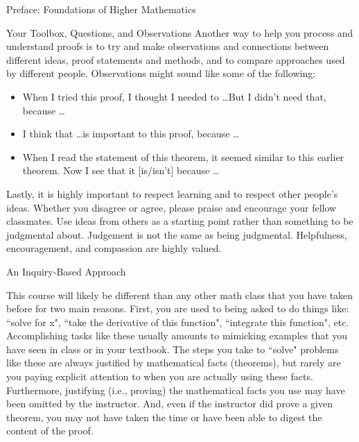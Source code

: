 \documentclass[11pt]{article}
\begin{document}
\begin{section}{Preface: Foundations of Higher Mathematics}
\begin{subsection}{Your Toolbox, Questions, and Observations}
Another way to help you process and understand proofs is to try and make observations and connections between different ideas, proof statements and methods, and to compare approaches used by different people. Observations might sound like some of the following:
\begin{itemize}
\item When I tried this proof, I thought I needed to \ldots But I didn't need that, because \ldots
\item I think that \ldots is important to this proof, because \ldots
\item When I read the statement of this theorem, it seemed similar to this earlier theorem. Now I see that it [is/isn't] because \ldots
\end{itemize}

Lastly, it is highly important to respect learning and to respect other people's ideas.  Whether you disagree or agree, please praise and encourage your fellow classmates.  Use ideas from others as a starting point rather than something to be judgmental about.  Judgement is not the same as being judgmental.  Helpfulness, encouragement, and compassion are highly valued.

\end{subsection}

\begin{subsection}{An Inquiry-Based Approach}

This course will likely be different than any other math class that you have taken before for two main reasons. First, you are used to being asked to do things like: ``solve for x", ``take the derivative of this function", ``integrate this function", etc. Accomplishing tasks like these usually amounts to mimicking examples that you have seen in class or in your textbook. The steps you take to ``solve" problems like these are always justified by mathematical facts (theorems), but rarely are you paying explicit attention to when you are actually using these facts. Furthermore, justifying (i.e., proving) the mathematical facts you use may have been omitted by the instructor. And, even if the instructor did prove a given theorem, you may not have taken the time or have been able to digest the content of the proof.


\end{subsection}
\end{section}
\end{document}
